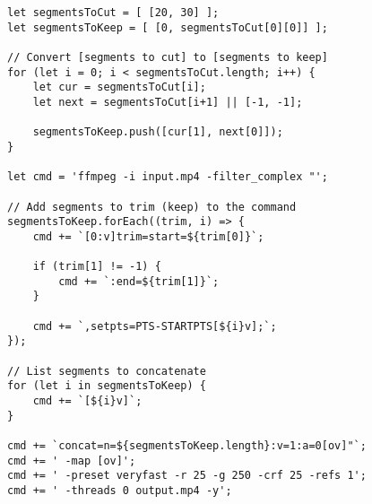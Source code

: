 \begin{verbatim}
let segmentsToCut = [ [20, 30] ];
let segmentsToKeep = [ [0, segmentsToCut[0][0]] ];

// Convert [segments to cut] to [segments to keep]
for (let i = 0; i < segmentsToCut.length; i++) {
    let cur = segmentsToCut[i];
    let next = segmentsToCut[i+1] || [-1, -1];

    segmentsToKeep.push([cur[1], next[0]]);
}

let cmd = 'ffmpeg -i input.mp4 -filter_complex "';

// Add segments to trim (keep) to the command
segmentsToKeep.forEach((trim, i) => {
    cmd += `[0:v]trim=start=${trim[0]}`;
	
    if (trim[1] != -1) {
        cmd += `:end=${trim[1]}`;
    }
	
    cmd += `,setpts=PTS-STARTPTS[${i}v];`;
});

// List segments to concatenate
for (let i in segmentsToKeep) {
    cmd += `[${i}v]`;
}

cmd += `concat=n=${segmentsToKeep.length}:v=1:a=0[ov]"`;
cmd += ' -map [ov]';
cmd += ' -preset veryfast -r 25 -g 250 -crf 25 -refs 1';
cmd += ' -threads 0 output.mp4 -y';
\end{verbatim}

